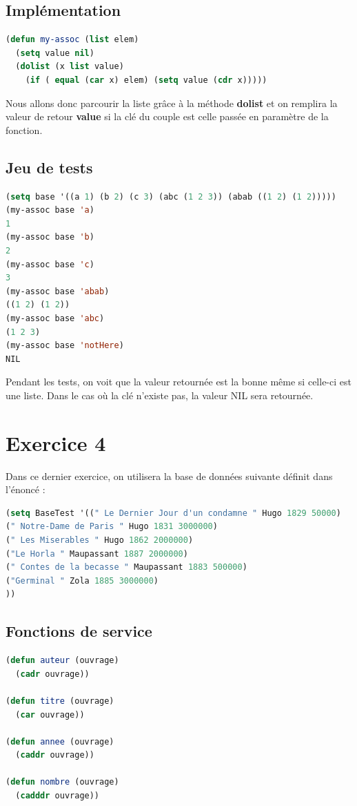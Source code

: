 \documentclass[a4paper,10pt]{report}
\begin{document}
	  \section{Implémentation}
	  \begin{lstlisting}[language=Lisp]
(defun my-assoc (list elem)
  (setq value nil)
  (dolist (x list value)
    (if ( equal (car x) elem) (setq value (cdr x)))))
	  \end{lstlisting}

	  Nous allons donc parcourir la liste grâce à la méthode \textbf{dolist} et on remplira la valeur de retour \textbf{value} si la clé du couple est celle passée en paramètre de la fonction.
	  
	  
	  \section{Jeu de tests}
	  
	  \begin{lstlisting}[language=lisp]
(setq base '((a 1) (b 2) (c 3) (abc (1 2 3)) (abab ((1 2) (1 2)))))
(my-assoc base 'a)
1
(my-assoc base 'b)
2
(my-assoc base 'c)
3
(my-assoc base 'abab)
((1 2) (1 2))
(my-assoc base 'abc)
(1 2 3)
(my-assoc base 'notHere)
NIL
	  \end{lstlisting}
Pendant les tests, on voit que la valeur retournée est la bonne même si celle-ci est une liste. Dans le cas où la clé n'existe pas, la valeur NIL sera retournée.
	  
	  
	  \chapter{Exercice 4} 
	  
	  Dans ce dernier exercice, on utilisera la base de données suivante définit dans l’énoncé :
	  \begin{lstlisting}[language=Lisp]
(setq BaseTest '((" Le Dernier Jour d'un condamne " Hugo 1829 50000)
(" Notre-Dame de Paris " Hugo 1831 3000000)
(" Les Miserables " Hugo 1862 2000000)
("Le Horla " Maupassant 1887 2000000)
(" Contes de la becasse " Maupassant 1883 500000)
("Germinal " Zola 1885 3000000)
))
	  \end{lstlisting}
	  
	  \section{Fonctions de service}
	  
	  \begin{lstlisting}[language=Lisp]
(defun auteur (ouvrage)
  (cadr ouvrage))

(defun titre (ouvrage)
  (car ouvrage))

(defun annee (ouvrage)
  (caddr ouvrage))

(defun nombre (ouvrage)
  (cadddr ouvrage))
	  \end{lstlisting}
	  
\end{document}
